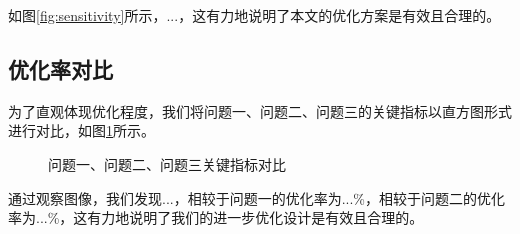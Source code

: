 如图\ref{fig:sensitivity}所示，...，这有力地说明了本文的优化方案是有效且合理的。

\subsection{优化率对比}

为了直观体现优化程度，我们将问题一、问题二、问题三的关键指标以直方图形式进行对比，如图\ref{fig:compare}所示。

\begin{figure}[H]
  \centering
  \caption{问题一、问题二、问题三关键指标对比}
  \label{fig:compare}
\end{figure}

通过观察图像，我们发现...，相较于问题一的优化率为...\%，相较于问题二的优化率为...\%，这有力地说明了我们的进一步优化设计是有效且合理的。
